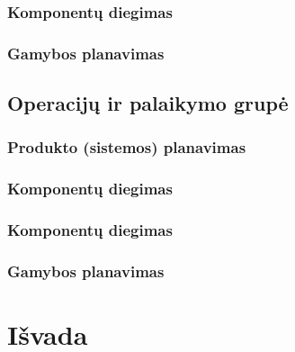 \documentclass{VUMIFPSkursinis}
\begin{document}
\subsubsection{Komponentų diegimas}
\subsubsection{Gamybos planavimas}
\subsection{Operacijų ir palaikymo grupė}
\subsubsection{Produkto (sistemos) planavimas}
\subsubsection{Komponentų diegimas}
\subsubsection{Komponentų diegimas}
\subsubsection{Gamybos planavimas}

\section{Išvada}
\end{document}
